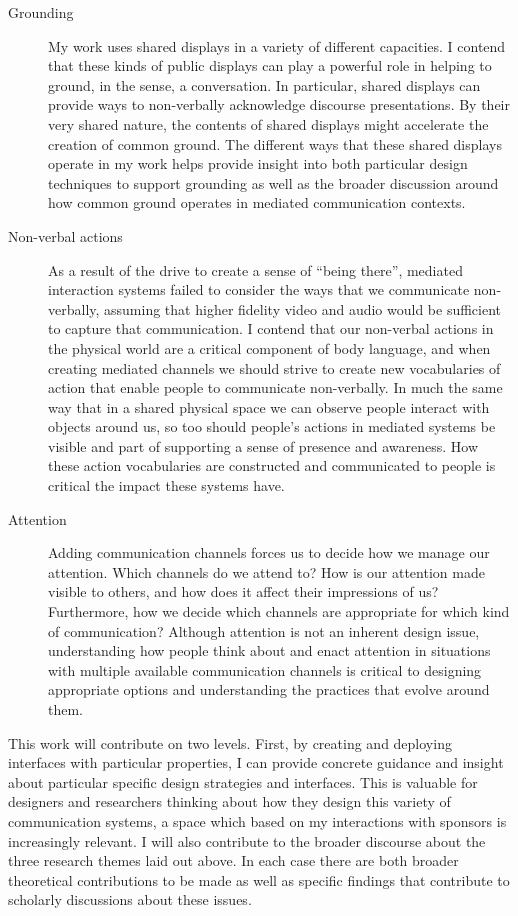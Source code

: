 \documentclass{tufte-handout}
\begin{document}
\begin{description}
	\item[Grounding]{My work uses shared displays in a variety of different capacities. I contend that these kinds of public displays can play a powerful role in helping to ground, in the \citet{Clark:1989uc} sense, a conversation. In particular, shared displays can provide ways to non-verbally acknowledge discourse presentations. By their very shared nature, the contents of shared displays might accelerate the creation of common ground. The different ways that these shared displays operate in my work helps provide insight into both particular design techniques to support grounding as well as the broader discussion around how common ground operates in mediated communication contexts.}
	\item[Non-verbal actions]{As a result of the drive to create a sense of ``being there'', mediated interaction systems failed to consider the ways that we communicate non-verbally, assuming that higher fidelity video and audio would be sufficient to capture that communication. I contend that our non-verbal actions in the physical world are a critical component of body language, and when creating mediated channels we should strive to create new vocabularies of action that enable people to communicate non-verbally. In much the same way that in a shared physical space we can observe people interact with objects around us, so too should people's actions in mediated systems be visible and part of supporting a sense of presence and awareness. How these action vocabularies are constructed and communicated to people is critical the impact these systems have.}
	\item[Attention]{Adding communication channels forces us to decide how we manage our attention. Which channels do we attend to? How is our attention made visible to others, and how does it affect their impressions of us? Furthermore, how we decide which channels are appropriate for which kind of communication? Although attention is not an inherent design issue, understanding how people think about and enact attention in situations with multiple available communication channels is critical to designing appropriate options and understanding the practices that evolve around them.}
\end{description}

This work will contribute on two levels. First, by creating and deploying interfaces with particular properties, I can provide concrete guidance and insight about particular specific design strategies and interfaces. This is valuable for designers and researchers thinking about how they design this variety of communication systems, a space which based on my interactions with sponsors is increasingly relevant. I will also contribute to the broader discourse about the three research themes laid out above. In each case there are both broader theoretical contributions to be made as well as specific findings that contribute to scholarly discussions about these issues.
\end{document}
